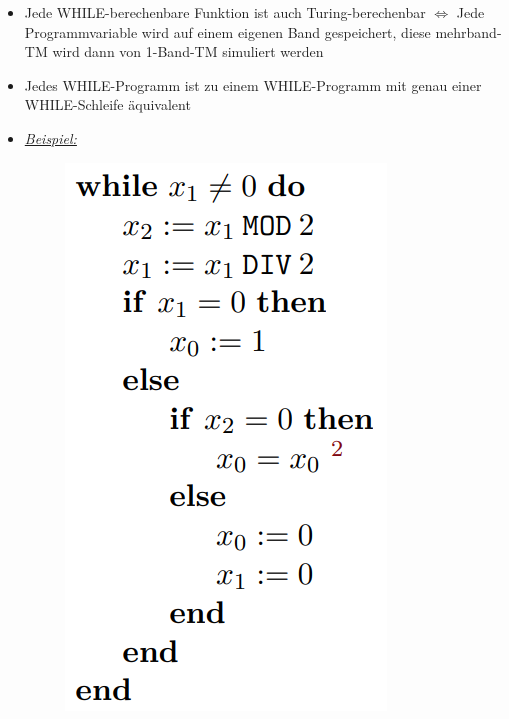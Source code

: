 \documentclass[ieeetran]{article}
\begin{document}
\begin{itemize}
\item Jede WHILE-berechenbare Funktion ist auch Turing-berechenbar $\Leftrightarrow$ Jede Programmvariable wird auf einem eigenen Band gespeichert, diese mehrband-TM wird dann von 1-Band-TM simuliert werden

\item Jedes WHILE-Programm ist zu einem WHILE-Programm mit genau einer WHILE-Schleife äquivalent

\item \textit{\underline{Beispiel:}}
	\begin{figure}[h!]
	  \centering
	  \includegraphics[width=0.2\linewidth]{whileexample}
	  \label{fig:whileexample}
	\end{figure}
\end{itemize}
\end{document}
